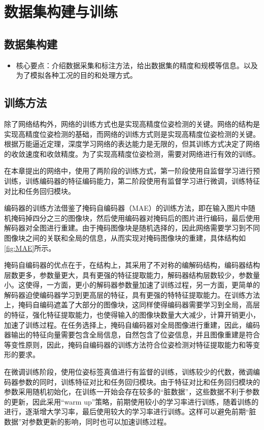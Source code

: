 \documentclass{Diploma}
\begin{document}
\section{数据集构建与训练}
\subsection{数据集构建}
\begin{itemize}
  \item 核心要点：介绍数据采集和标注方法，给出数据集的精度和规模等信息。以及为了模拟各种工况的目的和处理方式。
\end{itemize}
\subsection{训练方法}
除了网络结构外，网络的训练方式也是实现高精度位姿检测的关键。网络的结构是实现高精度位姿检测的基础，而网络的训练方式则是实现高精度位姿检测的关键。根据万能逼近定理，深度学习网络的表达能力是无限的，但其训练方式决定了网络的收敛速度和收敛精度。为了实现高精度位姿检测，需要对网络进行有效的训练。

在本章提出的网络中，使用了两阶段的训练方式，第一阶段使用自监督学习进行预训练，训练编码器的特征编码能力，第二阶段使用有监督学习进行微调，训练特征对比和任务回归模块。

%

编码器的训练方法借鉴了掩码自编码器（MAE）\cite{he2022masked}的训练方法，即在输入图片中随机掩码掉四分之三的图像块，然后使用编码器对掩码后的图片进行编码，最后使用解码器对全图进行重建。由于掩码图像块是随机选择的，因此网络需要学习到不同图像块之间的关联和全局的信息，从而实现对掩码图像块的重建，具体结构如\ref{fig:MAE}所示。

掩码自编码器的优点在于，在结构上，其采用了不对称的编解码结构，编码器结构层数更多，参数量更大，具有更强的特征提取能力，解码器结构层数较少，参数量小。这使得，一方面，更小的解码器参数量加速了训练过程，另一方面，更简单的解码器迫使编码器学习到更高层的特征，具有更强的特特征提取能力。在训练方法上，掩码自编码遮盖了大部分的图像块，这同样使得编码器需要学习到全局，高层的特征，强化特征提取能力，也使得输入的图像块数量大大减少，计算开销更小，加速了训练过程。在任务选择上，掩码自编码器对全局图像进行重建，因此，编码器输出的特征向量需要包含全局信息，自然包含了位姿信息，并且图像重建是符合等变性原则，因此，掩码自编码器的训练方法符合位姿检测对特征提取能力和等变形的要求。

在微调训练阶段，使用位姿标签真值进行有监督的训练，训练较少的代数，微调编码器参数的同时，训练特征对比和任务回归模块。由于特征对比和任务回归模块的参数采用随机初始化，在训练一开始会存在较多的“脏数据”，这些数据不利于参数的更新，因此采用“warm up”策略，前期使用较小的学习率进行训练，随着训练的进行，逐渐增大学习率，最后使用较大的学习率进行训练。这样可以避免前期“脏数据”对参数更新的影响，同时也可以加速训练过程。
\end{document}
